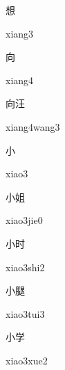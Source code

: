 \begin{multicols*}{2}
\begin{verbete}[xiang3]{想}
\begin{pronuncia}{xiang3}
\end{pronuncia}
\end{verbete}

\begin{verbete}[xiang4]{向}
\begin{pronuncia}{xiang4}
\end{pronuncia}
\end{verbete}

\begin{verbete}{向汪}
\begin{pronuncia}{xiang4wang3}
\end{pronuncia}
\end{verbete}

\begin{verbete}[xiao3]{小}
\begin{pronuncia}{xiao3}
\end{pronuncia}
\end{verbete}

\begin{verbete}{小姐}
\begin{pronuncia}{xiao3jie0}
\end{pronuncia}
\end{verbete}

\begin{verbete}{小时}
\begin{pronuncia}{xiao3shi2}
\end{pronuncia}
\end{verbete}

\begin{verbete}{小腿}
\begin{pronuncia}{xiao3tui3}
\end{pronuncia}
\end{verbete}

\begin{verbete}{小学}
\begin{pronuncia}{xiao3xue2}
\end{pronuncia}
\end{verbete}


\end{multicols*}
